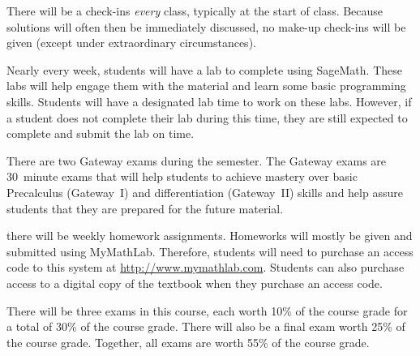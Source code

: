 \documentclass[11pt,letterpaper]{article}
\begin{document}


There will be a check-ins \textit{every} class, typically at the start of class. Because solutions will often then be immediately discussed, no make-up check-ins will be given (except under extraordinary circumstances). \pspace


Nearly every week, students will have a lab to complete using SageMath. These labs will help engage them with the material and learn some basic programming skills. Students will have a designated lab time to work on these labs. However, if a student does not complete their lab during this time, they are still expected to complete and submit the lab on time.
\pspace



\newpage



There are two Gateway exams during the semester. The Gateway exams are 30~minute exams that will help students to achieve mastery over basic Precalculus (Gateway~I) and differentiation (Gateway~II) skills and help assure students that they are prepared for the future material. 
\pspace


there will be weekly homework assignments. Homeworks will mostly be given and submitted using MyMathLab. Therefore, students will need to purchase an access code to this system at \url{http://www.mymathlab.com}. Students can also purchase access to a digital copy of the textbook when they purchase an access code.
\pspace


There will be three exams in this course, each worth 10\% of the course grade for a total of 30\% of the course grade. There will also be a final exam worth 25\% of the course grade. Together, all exams are worth 55\% of the course grade. 
\pspace
\end{document}
